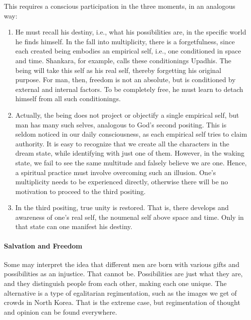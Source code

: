 This requires a conscious participation in the three moments, in an analogous way:

\begin{enumerate}


\item He must recall his destiny, i.e., what his possibilities are, in the specific world he finds himself. In the fall into multiplicity, there is a forgetfulness, since each created being embodies an empirical self, i.e., one conditioned in space and time. Shankara, for example, calls these conditionings Upadhis. The being will take this self as his real self, thereby forgetting his original purpose. For man, then, freedom is not an absolute, but is conditioned by external and internal factors. To be completely free, he must learn to detach himself from all such conditionings.

\item Actually, the being does not project or objectify a single empirical self, but man has many such selves, analogous to God's second positing. This is seldom noticed in our daily consciousness, as each empirical self tries to claim authority. It is easy to recognize that we create all the characters in the dream state, while identifying with just one of them. However, in the waking state, we fail to see the same multitude and falsely believe we are one. Hence, a spiritual practice must involve overcoming such an illusion. One's multiplicity needs to be experienced directly, otherwise there will be no motivation to proceed to the third positing.

\item In the third positing, true unity is restored. That is, there develops and awareness of one's real self, the noumenal self above space and time. Only in that state can one manifest his destiny.
\end{enumerate}


\paragraph{Salvation and Freedom}


Some may interpret the idea that different men are born with various gifts and possibilities as an injustice. That cannot be. Possibilities are just what they are, and they distinguish people from each other, making each one unique. The alternative is a type of egalitarian regimentation, such as the images we get of crowds in North Korea. That is the extreme case, but regimentation of thought and opinion can be found everywhere.

